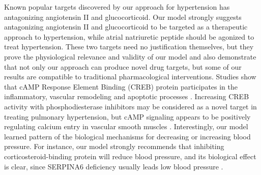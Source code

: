     Known popular targets discovered by our approach for hypertension has antagonizing angiotensin II and glucocorticoid. Our model strongly suggests antagonizing angiotensin II and glucocorticoid to be targeted as a therapeutic approach to hypertension, while atrial natriuretic peptide should be agonized to treat hypertension. These two targets need no justification themselves, but they prove the physiological relevance and validity of our model and also demonstrate that not only our approach can produce novel drug targets, but some of our results are compatible to traditional pharmacological interventions. Studies show that cAMP Response Element Binding (CREB) protein participates in the inflammatory, vascular remodeling and apoptotic processes \cite{ichiki2006role}. Increasing CREB activity with phosphodiesterase inhibitors may be considered as a novel target in treating pulmonary hypertension, but cAMP signaling appears to be positively regulating calcium entry in vascular smooth muscles \cite{pulver2004store}. Interestingly, our model learned pattern of the biological mechanisms for decreasing or increasing blood pressure. For instance, our model strongly recommends that inhibiting corticosteroid-binding protein will reduce blood pressure, and its biological effect is clear, since SERPINA6 deficiency usually leads low blood pressure \cite{torpy2001familial}. 
  
